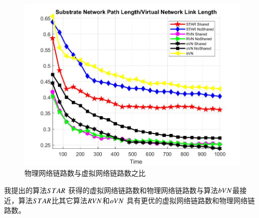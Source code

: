 \begin{figure}[htbp]
\begin{minipage}{0.4\textwidth}
\includegraphics[width=\textwidth]{figures/PathLengthSubVir2VirNet}
\caption{物理网络链路数与虚拟网络链路数之比}\label{fig:PathLengthSubVir2VirNet}
\end{minipage}\vspace{\baselineskip}
\end{figure}
我提出的算法$STAR$ 获得的虚拟网络链路数和物理网络链路数与算法$bVN$最接近，算法$STAR$比其它算法$RVN$和$oVN$ 具有更优的虚拟网络链路数和物理网络链路数。
